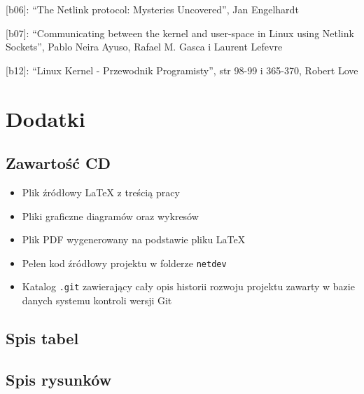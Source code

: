 {[}b06{]}: ``The Netlink protocol: Mysteries Uncovered'', Jan Engelhardt

{[}b07{]}: ``Communicating between the kernel and user-space in Linux
using Netlink Sockets'', Pablo Neira Ayuso, Rafael M. Gasca i Laurent
Lefevre

{[}b12{]}: ``Linux Kernel - Przewodnik Programisty'', str 98-99 i
365-370, Robert Love

\section{Dodatki}

\subsection{Zawartość CD}

\begin{itemize}
\itemsep1pt\parskip0pt
\item
  Plik źródłowy LaTeX z treścią pracy
\item
  Pliki graficzne diagramów oraz wykresów
\item
  Plik PDF wygenerowany na podstawie pliku LaTeX
\item
  Pełen kod źródłowy projektu w folderze \texttt{netdev}
\item
  Katalog \texttt{.git} zawierający cały opis historii rozwoju projektu
  zawarty w bazie danych systemu kontroli wersji Git
\end{itemize}

\subsection{Spis tabel}

\subsection{Spis rysunków}
